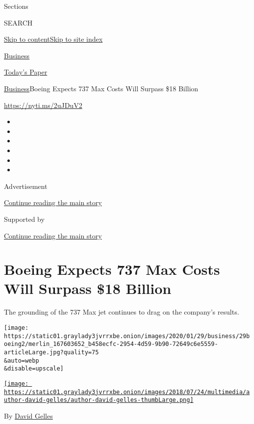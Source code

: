 Sections

SEARCH

\protect\hyperlink{site-content}{Skip to
content}\protect\hyperlink{site-index}{Skip to site index}

\href{https://www.nytimes3xbfgragh.onion/section/business}{Business}

\href{https://myaccount.nytimes3xbfgragh.onion/auth/login?response_type=cookie\&client_id=vi}{}

\href{https://www.nytimes3xbfgragh.onion/section/todayspaper}{Today's
Paper}

\href{/section/business}{Business}\textbar{}Boeing Expects 737 Max Costs
Will Surpass \$18 Billion

\url{https://nyti.ms/2uJDuV2}

\begin{itemize}
\item
\item
\item
\item
\item
\item
\end{itemize}

Advertisement

\protect\hyperlink{after-top}{Continue reading the main story}

Supported by

\protect\hyperlink{after-sponsor}{Continue reading the main story}

\hypertarget{boeing-expects-737-max-costs-will-surpass-18-billion}{%
\section{Boeing Expects 737 Max Costs Will Surpass \$18
Billion}\label{boeing-expects-737-max-costs-will-surpass-18-billion}}

The grounding of the 737 Max jet continues to drag on the company's
results.

\texttt{[image: https://static01.graylady3jvrrxbe.onion/images/2020/01/29/business/29boeing2/merlin\_167603652\_b458ecfc-2954-4d59-9b90-72649c6e5559-articleLarge.jpg?quality=75\\\&auto=webp\\\&disable=upscale]}

\href{https://www.nytimes3xbfgragh.onion/by/david-gelles}{\texttt{[image: https://static01.graylady3jvrrxbe.onion/images/2018/07/24/multimedia/author-david-gelles/author-david-gelles-thumbLarge.png]}}

By \href{https://www.nytimes3xbfgragh.onion/by/david-gelles}{David
Gelles}

